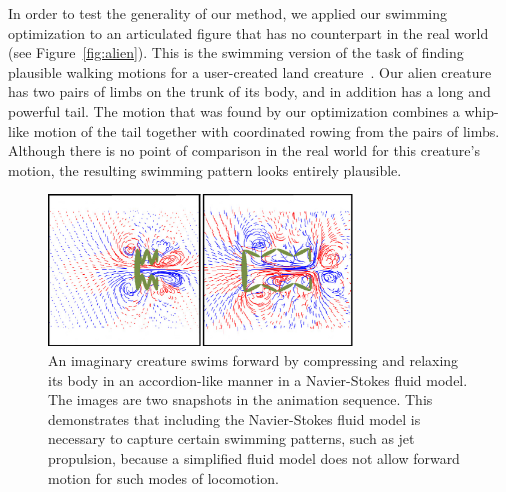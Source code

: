 In order to test the generality of our method, we applied our swimming
optimization to an articulated figure that has no counterpart in the real
world (see Figure~\ref{fig:alien}).  This is the swimming version of the task of finding plausible walking
motions for a user-created land
creature~\cite{hecker2008real,wampler2009optimal}.  Our alien creature has two
pairs of limbs on the trunk of its body, and in addition has a long and
powerful tail.  The motion that was found by our optimization combines a
whip-like motion of the tail together with coordinated rowing from the pairs of
limbs.  Although there is no point of comparison in the real world for this
creature's motion, the resulting swimming pattern looks entirely plausible.

\begin{figure}[!b]
\centering
\includegraphics[width=3.2in]{figures/accordian.eps}
\caption{An imaginary creature swims forward by compressing and relaxing its body in an accordion-like manner in a Navier-Stokes fluid model. The images are two snapshots in the animation sequence. This demonstrates that including the Navier-Stokes fluid model is necessary to capture certain swimming patterns, such as jet propulsion, because a simplified fluid model does not allow forward motion for such modes of locomotion.}
\label{fig:accordian}
\end{figure}

